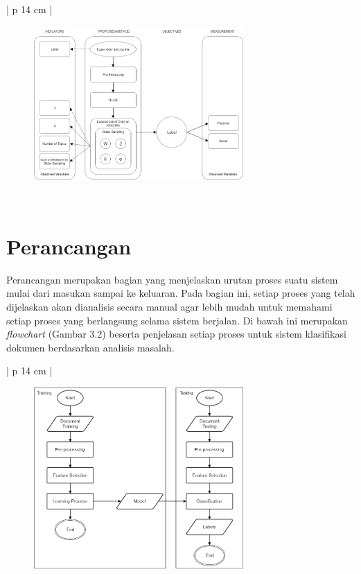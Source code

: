 \begin{table}[H]
\begin{adjustbox}{width=1\textwidth}
\begin{tabular}{| p {14 cm} |}
\hline
\begin{figure}[H]
	\centering
	\includegraphics[width=8cm]{images/KerangkaPemikiran}
\end{figure}\\
\hline
\end{tabular}
\end{adjustbox}
\end{table}

\section{Perancangan}
\indent
Perancangan merupakan bagian yang menjelaskan urutan proses suatu sistem mulai dari masukan sampai ke keluaran. Pada bagian ini, setiap proses yang telah dijelaskan akan dianalisis secara manual agar lebih mudah untuk memahami setiap proses yang berlangsung selama sistem berjalan. Di bawah ini merupakan {\itshape flowchart} (Gambar 3.2) beserta penjelasan setiap proses untuk sistem klasifikasi dokumen berdasarkan analisis masalah.

\begin{table}[H]
\begin{adjustbox}{width=1\textwidth}
\begin{tabular}{| p {14 cm} |}
\hline
\begin{figure}[H]
	\centering
	\includegraphics[width=8cm]{images/FlowchartGlobal}
\end{figure}\\
\hline
\end{tabular}
\end{adjustbox}
\end{table}

